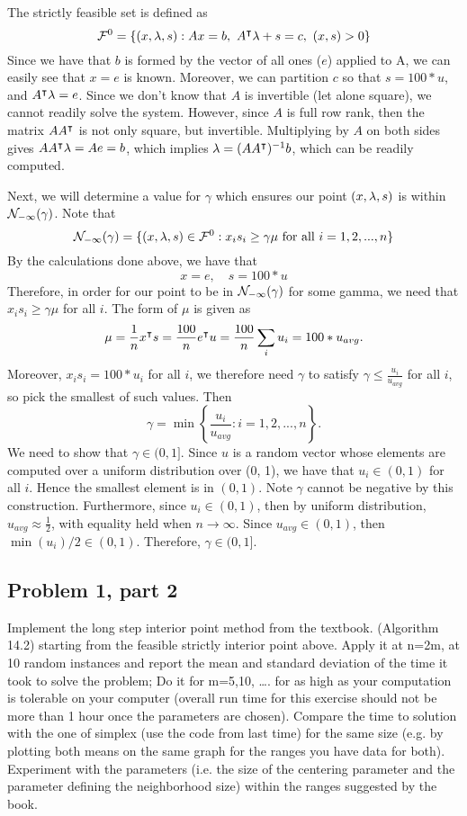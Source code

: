 \begin{solution}

    The strictly feasible set is defined as 
    \[\mathcal{F}^0 = \{(x, \mathrm{\lambda}, s) : Ax = b, \ A^{\intercal} \mathrm{\lambda} + s = c, \ (x, s) > 0\}\]
    Since we have that $b$ is formed by the vector of all ones ($e$) applied to A, we can easily see that $x = e$ is known. Moreover, we can partition $c$ so that $s = 100*u$, and $A^{\intercal} \mathrm{\lambda} = e$. Since we don't know that $A$ is invertible (let alone square), we cannot readily solve the system. However, since $A$ is full row rank, then the matrix $AA^{\intercal}$ is not only square, but invertible. Multiplying by $A$ on both sides gives $AA^{\intercal} \mathrm{\lambda}= Ae = b$, which implies $\mathrm{\lambda} = (AA^{\intercal})^{-1} b$, which can be readily computed. \par

    \jump
    Next, we will determine a value for $\gamma$ which ensures our point $(x, \mathrm{\lambda}, s)$ is within $\mathcal{N}_{-\infty}(\gamma)$. Note that
    \[\mathcal{N}_{-\infty}(\gamma) = \{(x, \mathrm{\lambda}, s) \in \mathcal{F} ^0 : x_is_i \geq \gamma \mu \text{ for all } i = 1, 2, ..., n\}\]
    By the calculations done above, we have that 
    \[x = e, \quad s = 100*u\]
    Therefore, in order for our point to be in $\mathcal{N}_{-\infty}(\gamma)$ for some gamma, we need that $x_is_i \geq \gamma\mu$ for all $i$. The form of $\mu$ is given as 
    \[\mu = \frac{1}{n}x^{\intercal} s = \frac{100}{n}e^{\intercal} u = \frac{100}{n}\sum_i u_i = 100 * u_{avg}.\]
    Moreover, $x_is_i = 100 * u_i$ for all $i$, we therefore need $\gamma$ to satisfy $\gamma \leq \frac{u_i}{u_{avg}}$ for all $i$, so pick the smallest of such values. Then 
    \[\gamma = \min\left\{ \frac{u_i}{u_{avg}} : i = 1, 2, ..., n\right\}.\]
    We need to show that $\gamma \in (0, 1]$. Since $u$ is a random vector whose elements are computed over a uniform distribution over (0, 1), we have that $u_i \in (0, 1)$ for all $i$. Hence the smallest element is in $(0, 1)$. Note $\gamma$ cannot be negative by this construction. Furthermore, since $u_i \in (0, 1)$, then by uniform distribution, $u_{avg} \approx \frac{1}{2}$, with equality held when $n \to \infty$. Since $u_{avg} \in(0, 1)$, then $\min (u_{i})/2 \in (0, 1)$. Therefore, $\gamma \in (0, 1]$.   
\end{solution}

\newpage
\subsection{Problem 1, part 2}
Implement the long step interior point method from the textbook. (Algorithm 14.2) starting from the feasible strictly interior point above. Apply it at n=2m, at 10 random instances and report the mean and standard deviation of the time it took to solve the problem; Do it for m=5,10, …. for as high as your computation is tolerable on your computer (overall run time for this exercise should not be more than 1 hour once the parameters are chosen). Compare the time to solution with the one of simplex (use the code from last time) for the same size (e.g. by plotting both means on the same graph for the ranges you have data for both). Experiment with the parameters (i.e. the size of the centering parameter and the parameter defining the neighborhood size) within the ranges suggested by the book.

